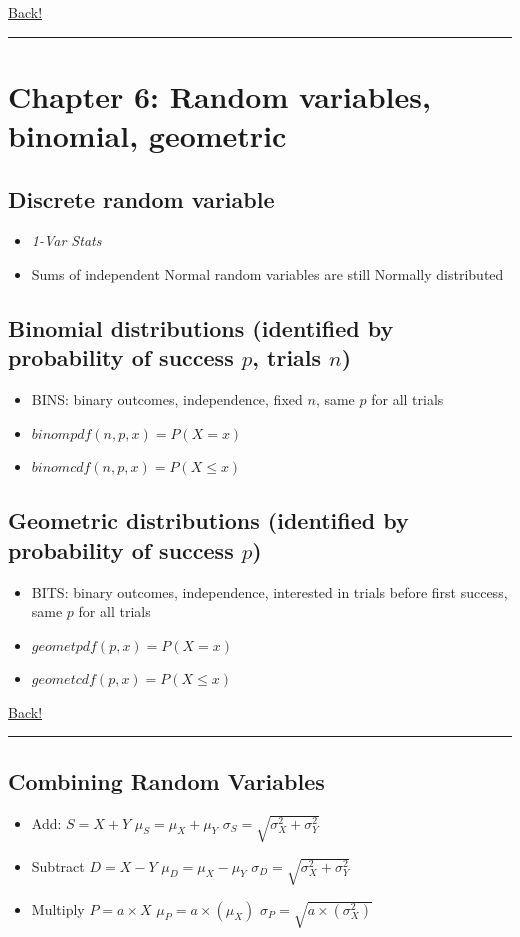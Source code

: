 \documentclass[main]{subfiles}
\begin{document}
\noindent\hyperlink{toc}{Back!}
\newline\hrule

\section{Chapter 6: Random variables, binomial, geometric}

\subsection{Discrete random variable}
\begin{itemize}
    \item \textit{1-Var Stats}
    \item Sums of independent Normal random variables are still Normally distributed
\end{itemize}

\subsection{Binomial distributions (identified by probability of success $p$, trials $n$)}
\begin{itemize}
    \item BINS: binary outcomes, independence, fixed $n$, same $p$ for all trials
    \item $binompdf(n, p, x) = P(X = x)$
    \item $binomcdf(n, p, x) = P(X \leq x)$
\end{itemize}

\subsection{Geometric distributions (identified by probability of success $p$)}
\begin{itemize}
    \item BITS: binary outcomes, independence, interested in trials before first success, same $p$ for all trials
    \item $geometpdf(p, x) = P(X = x)$
    \item $geometcdf(p, x) = P(X \leq x)$
\end{itemize}

\noindent\hyperlink{toc}{Back!}
\newline\hrule

\subsection{Combining Random Variables}
\begin{itemize}
    \item Add: $S = X + Y$
        \subitem $\mu_{S} = \mu_X + \mu_Y$
        \subitem $\sigma_S = \sqrt{\sigma_X^2 + \sigma_Y^2}$
    \item Subtract $D = X - Y$
        \subitem $\mu_{D} = \mu_X - \mu_Y$
        \subitem $\sigma_D = \sqrt{\sigma_X^2 + \sigma_Y^2}$
    \item Multiply $P = a \times X$
        \subitem $\mu_{P} = a \times (\mu_X)$
        \subitem $\sigma_P = \sqrt{a \times (\sigma_X^2)}$
\end{itemize}
\end{document}
